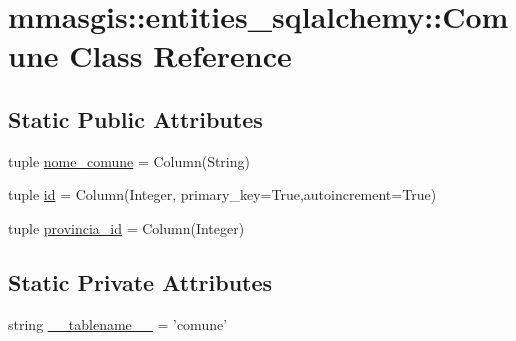 \hypertarget{classmmasgis_1_1entities__sqlalchemy_1_1Comune}{
\section{mmasgis::entities\_\-sqlalchemy::Comune Class Reference}
\label{classmmasgis_1_1entities__sqlalchemy_1_1Comune}
}
\subsection*{Static Public Attributes}
\begin{DoxyCompactItemize}
\item 
tuple \hyperlink{classmmasgis_1_1entities__sqlalchemy_1_1Comune_a4172bd3523a11386f4e3fa72e99b1fb4}{nome\_\-comune} = Column(String)
\item 
tuple \hyperlink{classmmasgis_1_1entities__sqlalchemy_1_1Comune_a50923f20833709501573592b19acd6f3}{id} = Column(Integer, primary\_\-key=True,autoincrement=True)
\item 
tuple \hyperlink{classmmasgis_1_1entities__sqlalchemy_1_1Comune_a13c3ed74087231f8bc9b9da82a8ab4c6}{provincia\_\-id} = Column(Integer)
\end{DoxyCompactItemize}
\subsection*{Static Private Attributes}
\begin{DoxyCompactItemize}
\item 
string \hyperlink{classmmasgis_1_1entities__sqlalchemy_1_1Comune_a83933f27aa90ad0c17c049c7364c8a96}{\_\-\_\-tablename\_\-\_\-} = 'comune'
\end{DoxyCompactItemize}


